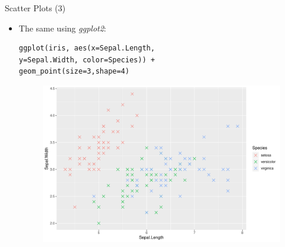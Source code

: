 \documentclass[handout]{beamer}
\begin{document}
\begin{frame}[fragile]{Scatter Plots (3)}
\scriptsize{
\begin{itemize}
 \item The same using \emph{ggplot2}:
 \begin{verbatim}
ggplot(iris, aes(x=Sepal.Length,
y=Sepal.Width, color=Species)) + 
geom_point(size=3,shape=4)
 \end{verbatim}

  \begin{figure}[h!]
	\centering
	\includegraphics[scale=0.4]{pics/scatterggplot2.pdf}		
\end{figure} 
 
 
\end{itemize}




}
\end{frame}
\end{document}
